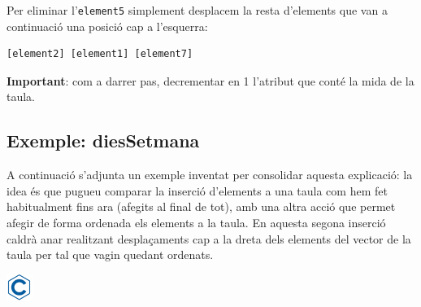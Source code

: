 \documentclass[]{book}
\begin{document}
Per eliminar l'\texttt{element5} simplement desplacem la resta
d'elements que van a continuació una posició cap a l'esquerra:

\begin{verbatim}
[element2] [element1] [element7]
\end{verbatim}

\textbf{Important}: com a darrer pas, decrementar en 1 l'atribut que
conté la mida de la taula.

\subsection{Exemple: diesSetmana}\label{exemple-diessetmana}

A continuació s'adjunta un exemple inventat per consolidar aquesta
explicació: la idea és que pugueu comparar la inserció d'elements a una
taula com hem fet habitualment fins ara (afegits al final de tot), amb
una altra acció que permet afegir de forma ordenada els elements a la
taula. En aquesta segona inserció caldrà anar realitzant desplaçaments
cap a la dreta dels elements del vector de la taula per tal que vagin
quedant ordenats.

\includegraphics{./img/c.png}
\end{document}
